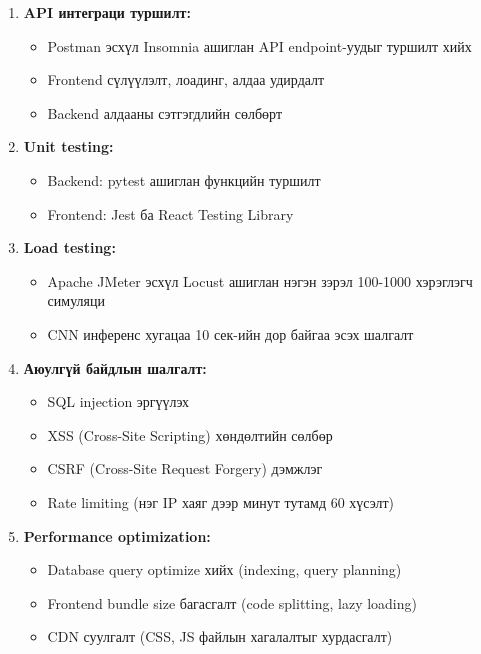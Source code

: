 \begin{enumerate}
    \item \textbf{API интеграци туршилт:}
    \begin{itemize}
        \item Postman эсхүл Insomnia ашиглан API endpoint-уудыг туршилт хийх
        \item Frontend сүлүүлэлт, лоадинг, алдаа удирдалт
        \item Backend алдааны сэтгэгдлийн сөлбөрт
    \end{itemize}
    
    \item \textbf{Unit testing:}
    \begin{itemize}
        \item Backend: pytest ашиглан функцийн туршилт
        \item Frontend: Jest ба React Testing Library
    \end{itemize}
    
    \item \textbf{Load testing:}
    \begin{itemize}
        \item Apache JMeter эсхүл Locust ашиглан нэгэн зэрэл 100-1000 хэрэглэгч симуляци
        \item CNN инференс хугацаа 10 сек-ийн дор байгаа эсэх шалгалт
    \end{itemize}
    
    \item \textbf{Аюулгүй байдлын шалгалт:}
    \begin{itemize}
        \item SQL injection эргүүлэх
        \item XSS (Cross-Site Scripting) хөндөлтийн сөлбөр
        \item CSRF (Cross-Site Request Forgery) дэмжлэг
        \item Rate limiting (нэг IP хаяг дээр минут тутамд 60 хүсэлт)
    \end{itemize}
    
    \item \textbf{Performance optimization:}
    \begin{itemize}
        \item Database query optimize хийх (indexing, query planning)
        \item Frontend bundle size багасгалт (code splitting, lazy loading)
        \item CDN суулгалт (CSS, JS файлын хагалалтыг хурдасгалт)
    \end{itemize}
\end{enumerate}

